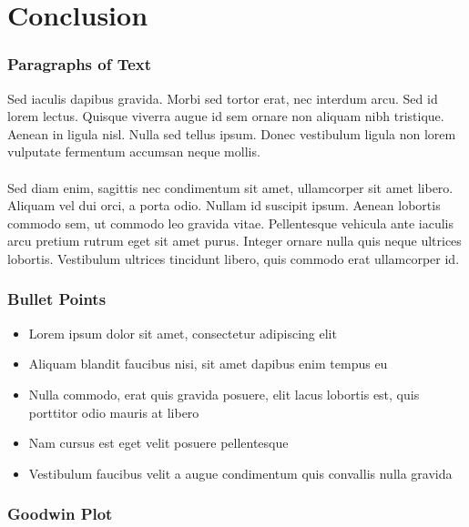 \documentclass{beamer}
\begin{document}
\section{Conclusion}
% 
\begin{frame}
\frametitle{Paragraphs of Text}
Sed iaculis dapibus gravida. Morbi sed tortor erat, nec interdum arcu. Sed id lorem lectus. Quisque viverra augue id sem ornare non aliquam nibh tristique. Aenean in ligula nisl. Nulla sed tellus ipsum. Donec vestibulum ligula non lorem vulputate fermentum accumsan neque mollis.\\~\\

Sed diam enim, sagittis nec condimentum sit amet, ullamcorper sit amet libero. Aliquam vel dui orci, a porta odio. Nullam id suscipit ipsum. Aenean lobortis commodo sem, ut commodo leo gravida vitae. Pellentesque vehicula ante iaculis arcu pretium rutrum eget sit amet purus. Integer ornare nulla quis neque ultrices lobortis. Vestibulum ultrices tincidunt libero, quis commodo erat ullamcorper id.
\end{frame}


\begin{frame}
\frametitle{Bullet Points}
\begin{itemize}
\item Lorem ipsum dolor sit amet, consectetur adipiscing elit
\item Aliquam blandit faucibus nisi, sit amet dapibus enim tempus eu
\item Nulla commodo, erat quis gravida posuere, elit lacus lobortis est, quis porttitor odio mauris at libero
\item Nam cursus est eget velit posuere pellentesque
\item Vestibulum faucibus velit a augue condimentum quis convallis nulla gravida
\end{itemize}
\end{frame}

\begin{frame}
\frametitle{Goodwin Plot}
\begin{center}
\label{frequencyGraph}

\end{center}
\end{frame}
\end{document}
